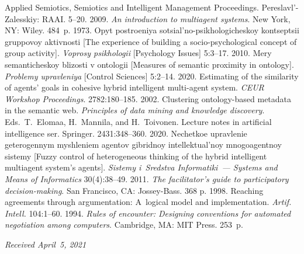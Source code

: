 \begin{multicols}{2}
{{\begin{thebibliography}{99}
{Applied Semiotics, Semiotics and Intelligent Management Proceedings}. Pereslavl'-Zalesskiy: RAAI. 5--20.
   2009. \textit{An introduction to multiagent systems}. New York, NY: Wiley. 484~p.
   1973. Opyt postroeniya sotsial'no-psikhologicheskoy kontseptsii gruppovoy 
aktivnosti [The experience of building a socio-psychological concept of group activity]. 
\textit{Voprosy psikhologii}  [Psychology Issues] 5:3--17.
   2010. Mery 
semanticheskoy blizosti v ontologii [Measures of semantic proximity in ontology]. 
\textit{Problemy upravleniya}  [Control Sciences] 5:2--14.
   2020. Estimating of the similarity of agents' goals in cohesive hybrid intelligent 
  multi-agent system. \textit{CEUR Workshop Proceedings}. 2782:180--185. 
   2002. Clustering ontology-based metadata in the semantic web. 
\textit{Principles of data mining and knowledge discovery}. 
Eds.\ T.~Elomaa, H.~Mannila, and H.~Toivonen. Lecture 
notes in artificial intelligence ser. Springer. 2431:348--360.
   2020. Nechetkoe upravlenie geterogennym myshleniem 
agentov gibridnoy intellektual'noy mnogoagentnoy sistemy [Fuzzy control of heterogeneous thinking of the 
hybrid intelligent multiagent system's agents]. \textit{Sistemy i~Sredstva Informatiki~--- Systems and Means of 
Informatics} 30(4):38--49.
   2011. \textit{The facilitator's guide to
   participatory decision-making}. San Francisco, CA: Jossey-Bass. 368 p.
   1998. Reaching agreements through argumentation: A~logical 
model and implementation. \textit{Artif. Intell.} 104:1--60.
   1994. \textit{Rules of encounter: Designing conventions for automated 
negotiation among computers}. Cambridge, MA: MIT Press. 253~p.
   \end{thebibliography}

 }
 }

\end{multicols}

\vspace*{-3pt}

  \hfill{\small\textit{Received April~5, 2021}}


